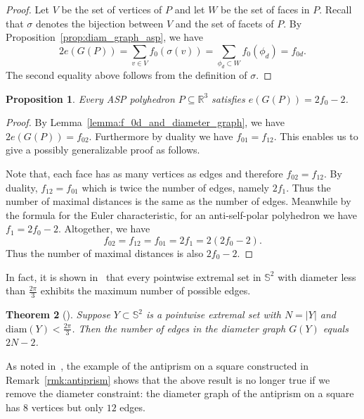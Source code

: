 \documentclass[12pt]{amsart}
\theoremstyle{plain}
\newtheorem{theorem}{Theorem}[section]
\newtheorem{proposition}[theorem]{Proposition}
\newcommand{\R}{\mathbb{R}}
\newcommand{\Sp}{\mathbb{S}}
\newcommand{\diam}{\mathrm{diam}}
\numberwithin{equation}{section}
\begin{document}
\begin{proof}
Let $V$ be the set of vertices of $P$ and let $W$ be the set of faces in $P$.
Recall that $\sigma$ denotes the bijection between $V$ and the set of facets of $P$.
By Proposition~\ref{prop:diam_graph_asp}, we have
\[
	2e(G(P)) = \sum_{v\in V} f_0(\sigma(v)) = \sum_{\phi_d\subset W}f_0(\phi_d) = f_{0d}.
\]
The second equality above follows from the definition of $\sigma.$

\end{proof}

\begin{proposition}\label{prop:anti-self-polar_extremal_edges}
Every ASP polyhedron $P\subseteq\R^3$ satisfies $e(G(P)) = 2f_0 -2$.
\end{proposition}

\begin{proof}

By Lemma~\ref{lemma:f_0d_and_diameter_graph}, we have $2e(G(P)) = f_{02}$.
Furthermore by duality we have $f_{01}=f_{12}$.  This enables us to give a possibly
generalizable proof as follows.


Note that, each face has as many vertices as edges and therefore $f_{02}=f_{12}$.  By
duality, $f_{12}=f_{01}$ which is twice the number of edges, namely $2f_1$.  Thus the number of maximal distances is the same as the number
of edges.  Meanwhile by the formula for the Euler characteristic, for
an anti-self-polar polyhedron we have $f_1=2 f_0 - 2$.  Altogether, we have
\[
f_{02}=f_{12}=f_{01}=2f_1 = 2 (2f_0-2).
\]
Thus the number of maximal distances is also $2 f_0 -2$.
\end{proof}




In fact, it is shown in~\cite{katz1989diameter} that every pointwise extremal set in $\Sp^2$ with diameter less than $\frac{2\pi}{3}$ exhibits the maximum number of possible edges.

\begin{theorem}[{\cite[Theorem~1]{katz1989diameter}}]
Suppose $Y\subset \Sp^2$ is a pointwise extremal set with $N=|Y|$ and
$\diam(Y)< \frac{2\pi}{3}$.  Then the number of edges in the diameter
graph $G(Y)$ equals $2N-2$.
\end{theorem}





As noted in~\cite[page~118]{katz1989diameter}, the example of the
antiprism on a square constructed in Remark~\ref{rmk:antiprism} shows
that the above result is no longer true if we remove the diameter
constraint: the diameter graph of the antiprism on a square has $8$
vertices but only $12$ edges.
\end{document}

